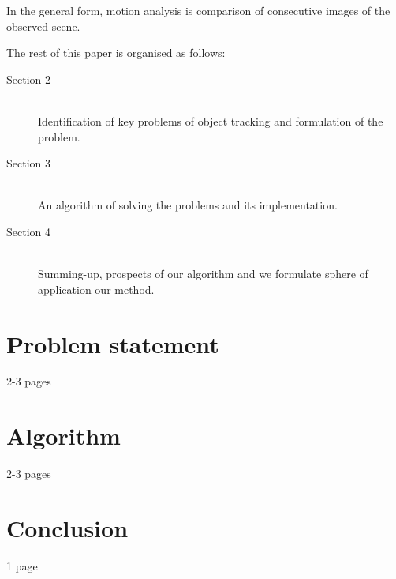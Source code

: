 \documentclass[12pt,a4paper,oneside,titlepage]{article}
\begin{document}
In the general form, motion analysis is comparison of consecutive images of the observed scene.

The rest of this paper is organised as follows:
\begin{description}
  \item[Section 2] \hfill \\
  Identification of key problems of object tracking and formulation of the problem.
  \item[Section 3] \hfill \\
  An algorithm of solving the problems and its implementation. 
  \item[Section 4] \hfill \\
  Summing-up, prospects of our algorithm and we formulate sphere of application our method.
\end{description}

\newpage
\section*{Problem statement}
2-3 pages



\newpage
\section*{Algorithm}
2-3 pages



\newpage
\section*{Conclusion}
1 page


\newpage
\renewcommand\refname{Bibliography}


\end{document}
